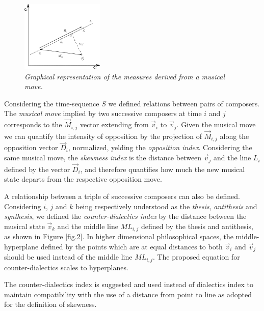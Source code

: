 \documentclass[
 aip,
 jmp,
 amsmath,amssymb,
 reprint,
]{revtex4-1}
\begin{document}
\begin{figure}
        \begin{center}
                \includegraphics[width=0.35\textwidth]{phil-space-desc_}
        \end{center}
        \caption{\it Graphical representation of the measures derived from a \emph{musical move}\cite{Fabbri}.}
        \label{fig.1}
\end{figure}

Considering the time-sequence $S$ we defined relations between pairs of composers. The \emph{musical move} implied by two successive composers at time $i$ and $j$ corresponds to the $\vec{M}_{i,j}$ vector extending from $\vec{v}_i$ to $\vec{v}_j$. Given the musical move we can quantify the intensity of opposition by the projection of $\vec{M}_{i,j}$ along the opposition vector $\vec{D}_i$, normalized, yelding the \emph{opposition index}. Considering the same musical move, the \emph{skewness index} is the distance between $\vec{v}_j$ and the line $L_i$ defined by the vector $\vec{D}_i$, and therefore quantifies how much the new
musical state departs from the respective opposition move.

A relationship between a triple of successive composers can also be defined. Considering $i$, $j$ and $k$ being respectively understood as the \emph{thesis}, \emph{antithesis} and \emph{synthesis}, we defined the \emph{counter-dialectics index} by the distance between the musical state $\vec{v}_k$ and the middle line $ML_{i,j}$ defined by the thesis and antithesis, as shown in Figure \ref{fig.2}. In higher dimensional philosophical spaces,
the middle-hyperplane defined by the points which are at equal
distances to both $\vec{v}_i$ and $\vec{v}_j$ should be used instead
of the middle line $ML_{i,j}$. The proposed equation for counter-dialectics scales to hyperplanes.

The counter-dialectics index is suggested and used instead of dialectics index to maintain compatibility with the use of a distance from point to line as adopted for the definition of skewness.
\end{document}

